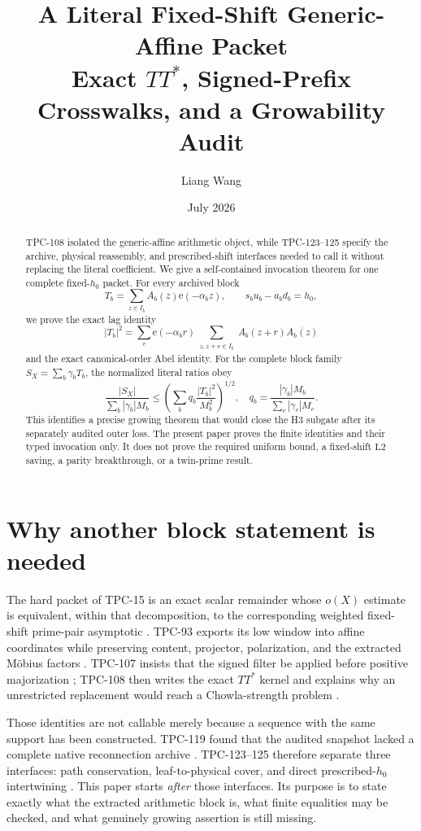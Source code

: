 \documentclass[11pt]{article}
\title{\textbf{A Literal Fixed-Shift Generic-Affine Packet}\\
\large Exact \(TT^*\), Signed-Prefix Crosswalks, and a
Growability Audit}
\author{Liang Wang}
\date{July 2026}
\theoremstyle{definition}
\theoremstyle{remark}
\newcommand{\e}{\mathrm e}
\newcommand{\Ltwo}{\mathrm{L2}}
\begin{document}
\maketitle

\begin{abstract}
TPC-108 isolated the generic-affine arithmetic object, while
TPC-123--125 specify the archive, physical reassembly, and
prescribed-shift interfaces needed to call it without replacing the
literal coefficient.  We give a self-contained invocation theorem for
one complete fixed-\(h_0\) packet.  For every archived block
\[
 T_b=\sum_{z\in I_b}A_b(z)\e(-\alpha_bz),
 \qquad s_bu_b-a_bd_b=h_0,
\]
we prove the exact lag identity
\[
 |T_b|^2
 =\sum_r\e(-\alpha_br)
   \sum_{\substack{z,z+r\in I_b}}
   A_b(z+r)\overline{A_b(z)}
\]
and the exact canonical-order Abel identity.  For the complete block
family \(S_X=\sum_b\gamma_bT_b\), the normalized literal ratios obey
\[
 \frac{|S_X|}{\sum_b|\gamma_b|M_b}
 \le
 \left(\sum_bq_b\frac{|T_b|^2}{M_b^2}\right)^{1/2},
 \quad
 q_b=\frac{|\gamma_b|M_b}{\sum_c|\gamma_c|M_c}.
\]
This identifies a precise growing theorem that would close the H3
subgate after its separately audited outer loss.  The present paper
proves the finite identities and their typed invocation only.  It
does not prove the required uniform bound, a fixed-shift
\(\Ltwo\) saving, a parity breakthrough, or a twin-prime result.
\end{abstract}

\section{Why another block statement is needed}

The hard packet of TPC-15 is an exact scalar remainder whose
\(o(X)\) estimate is equivalent, within that decomposition, to the
corresponding weighted fixed-shift prime-pair asymptotic
\citep{WangTPC15}.  TPC-93 exports its low window into affine
coordinates while preserving content, projector, polarization, and
the extracted M\"obius factors \citep{WangTPC93}.  TPC-107 insists
that the signed filter be applied before positive majorization
\citep{WangTPC107}; TPC-108 then writes the exact \(TT^*\) kernel and
explains why an unrestricted replacement would reach a
Chowla-strength problem \citep{WangTPC108,Tao2016LogChowla}.

Those identities are not callable merely because a sequence with the
same support has been constructed.  TPC-119 found that the audited
snapshot lacked a complete native reconnection archive
\citep{WangTPC119}.  TPC-123--125 therefore separate three interfaces:
path conservation, leaf-to-physical cover, and direct
prescribed-\(h_0\) intertwining
\citep{WangTPC123,WangTPC124,WangTPC125}.  This paper starts
\emph{after} those interfaces.  Its purpose is to state exactly what
the extracted arithmetic block is, what finite equalities may be
checked, and what genuinely growing assertion is still missing.
\end{document}
